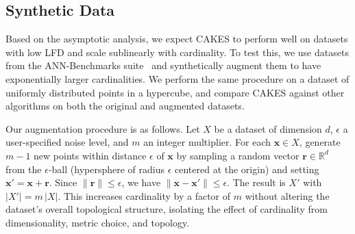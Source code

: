 \subsection{Synthetic Data}
\label{sec:methods:synthetic-data}

Based on the asymptotic analysis, we expect CAKES to perform well on datasets with low LFD and scale sublinearly with cardinality.
To test this, we use datasets from the ANN-Benchmarks suite~\cite{aumuller2020ann} and synthetically augment them to have exponentially larger cardinalities.
We perform the same procedure on a dataset of uniformly distributed points in a hypercube, and compare CAKES against other algorithms on both the original and augmented datasets.

Our augmentation procedure is as follows.
Let $X$ be a dataset of dimension $d$, $\epsilon$ a user-specified noise level, and $m$ an integer multiplier.
For each $\mathbf{x}\in X$, generate $m-1$ new points within distance $\epsilon$ of $\mathbf{x}$ by sampling a random vector $\mathbf{r}\in\mathbb{R}^d$ from the $\epsilon$-ball (hypersphere of radius $\epsilon$ centered at the origin) and setting $\mathbf{x}'=\mathbf{x}+\mathbf{r}$.
Since $\lVert\mathbf{r}\rVert\le\epsilon$, we have $\lVert\mathbf{x}-\mathbf{x}'\rVert\le\epsilon$.
The result is $X'$ with $\lvert X'\rvert=m\,\lvert X\rvert$.
This increases cardinality by a factor of $m$ without altering the dataset’s overall topological structure, isolating the effect of cardinality from dimensionality, metric choice, and topology.
